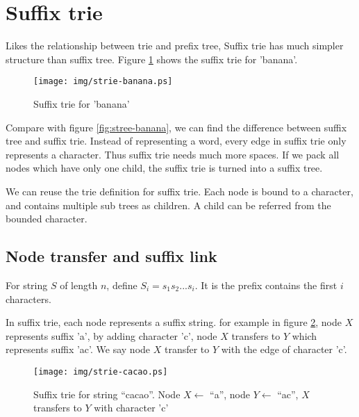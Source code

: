 \documentclass{article}
\begin{document}
\section{Suffix trie}
\label{suffix-trie}

Likes the relationship between trie and prefix tree, Suffix trie has much simpler
structure than suffix tree. Figure \ref{fig:strie-banana} shows the suffix trie for
'banana'.

\begin{figure}[htbp]
  \centering
  \texttt{[image: img/strie-banana.ps]}
  \caption{Suffix trie for 'banana'} \label{fig:strie-banana}
\end{figure}

Compare with figure \ref{fig:stree-banana}, we can find the difference between
suffix tree and suffix trie. Instead of representing
a word, every edge in suffix trie only represents a character.
Thus suffix trie needs much more spaces.
If we pack all nodes which have only one child, the suffix
trie is turned into a suffix tree.

We can reuse the trie definition for suffix trie. Each node is bound to a
character, and contains multiple sub trees as children. A child can be
referred from the bounded character.

\subsection{Node transfer and suffix link}

For string $S$ of length $n$, define $S_i=s_1s_2...s_i$.
It is the prefix contains the first $i$ characters.

In suffix trie, each node represents a suffix string. for example in figure
\ref{fig:strie-cacao}, node $X$ represents suffix 'a', by adding character 'c',
node $X$ transfers to $Y$ which represents suffix 'ac'. We say node $X$ transfer
to $Y$ with the edge of character 'c'\cite{ukkonen95}.

\begin{figure}[htbp]
  \centering
  \texttt{[image: img/strie-cacao.ps]}
  \caption{Suffix trie for string ``cacao''. Node $X \gets$ ``a'', node $Y \gets$ ``ac'', $X$ transfers to $Y$ with character 'c'}
  \label{fig:strie-cacao}
\end{figure}
\end{document}
